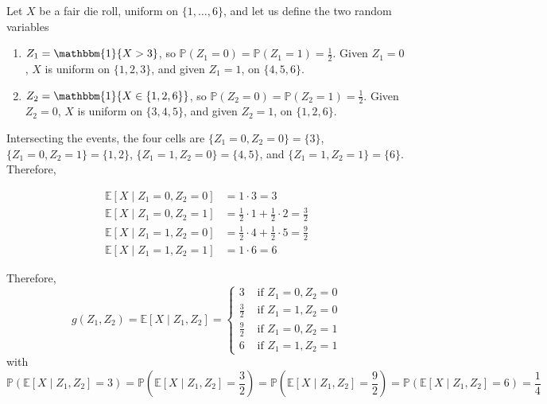 	\begin{example}
		Let $X$ be a fair die roll, uniform on $\{1, \dots, 6\}$, and let us define the two random variables
		\begin{enumerate}
			\item $Z_1 = \mathbbm{1}\{X > 3\}$, so $\mathbb{P}(Z_1 = 0) = \mathbb{P}(Z_1 = 1) = \frac{1}{2}$. Given $Z_1 = 0$, $X$ is uniform on $\{1, 2, 3\}$, and given $Z_1 = 1$, on $\{4, 5, 6\}$.

			\item $Z_2 = \mathbbm{1}\{X \in \{1, 2, 6\}\}$, so $\mathbb{P}(Z_2 = 0) = \mathbb{P}(Z_2 = 1) = \frac{1}{2}$. Given $Z_2 = 0$, $X$ is uniform on $\{3, 4, 5\}$, and given $Z_2 = 1$, on $\{1, 2, 6\}$.
		\end{enumerate}

		Intersecting the events, the four cells are $\{Z_1 = 0, Z_2 = 0\} = \{3\}$, $\{Z_1 = 0, Z_2 = 1\} = \{1, 2\}$, $\{Z_1 = 1, Z_2 = 0\} = \{4, 5\}$, and $\{Z_1 = 1, Z_2 = 1\} = \{6\}$. Therefore,

		\begin{align}
			\mathbb{E}[X \mid Z_1 = 0, Z_2 = 0] & = 1 \cdot 3 = 3 \\
			\mathbb{E}[X \mid Z_1 = 0, Z_2 = 1] & = \tfrac{1}{2} \cdot 1 + \tfrac{1}{2} \cdot 2 = \tfrac{3}{2} \\
			\mathbb{E}[X \mid Z_1 = 1, Z_2 = 0] & = \tfrac{1}{2} \cdot 4 + \tfrac{1}{2} \cdot 5 = \tfrac{9}{2} \\
			\mathbb{E}[X \mid Z_1 = 1, Z_2 = 1] & = 1 \cdot 6 = 6
		\end{align}

		Therefore, 
		\begin{equation}
			g(Z_1, Z_2) = \mathbb{E}[X \mid Z_1, Z_2] = \begin{cases} 
				3 & \text{ if } Z_1 = 0, Z_2 = 0 \\ 
				\frac{3}{2} & \text{ if } Z_1 = 1, Z_2 = 0 \\ 
				\frac{9}{2} & \text{ if } Z_1 = 0, Z_2 = 1 \\ 
				6 & \text{ if } Z_1 = 1, Z_2 = 1 
			\end{cases}
		\end{equation}
		with 
		\begin{equation}
			\mathbb{P}(\mathbb{E}[X \mid Z_1, Z_2] = 3) =  \mathbb{P}(\mathbb{E}[X \mid Z_1, Z_2] = \frac{3}{2}) = \mathbb{P}(\mathbb{E}[X \mid Z_1, Z_2] = \frac{9}{2}) = \mathbb{P}(\mathbb{E}[X \mid Z_1, Z_2] = 6) = \frac{1}{4}
		\end{equation}
	\end{example}

